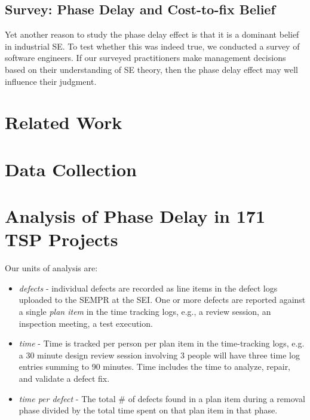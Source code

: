 \documentclass{sig-alternate}
\newcommand{\bi}{\begin{itemize}[leftmargin=0.4cm]}
\newcommand{\ei}{\end{itemize}}
\begin{document}
\subsection{Survey:  Phase Delay and Cost-to-fix Belief}\label{survey} 
Yet another reason to study the phase delay effect is that it is a dominant belief in industrial SE.
To test whether this was indeed true, we conducted a survey of software engineers. If our surveyed practitioners make management decisions based on their
understanding of SE theory, then the phase delay effect may well influence their judgment.



\section{Related Work}
 










%

 

\section{Data Collection}










\section{Analysis of Phase Delay in 171 TSP Projects}
Our units of analysis are:
\bi
    \item \emph{defects} - individual defects are recorded as line items in the defect logs uploaded to the SEMPR at the SEI. One or more defects are reported against a single \emph{plan item} in the time tracking logs, e.g., a review session, an inspection meeting, a test execution.
    \item \emph{time} - Time is tracked per person per plan item in the time-tracking logs, e.g. a 30 minute design review session involving 3 people will have three time log entries summing to 90 minutes. Time includes the time to analyze, repair, and validate a defect fix.
    \item \emph{time per defect} - The total \# of defects found in a plan item during a removal phase divided by the total time spent on that plan item in that phase.
\ei
\end{document}

